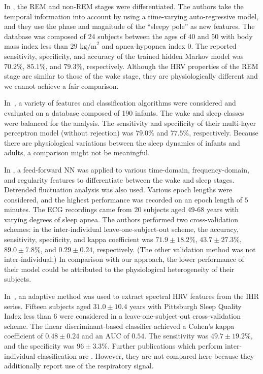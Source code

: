 \documentclass[10pt,a4paper,english]{amsart}
\begin{document}
In \cite{Mendez2010}, the REM and non-REM stages were differentiated. The authors take the temporal information into account by using a time-varying auto-regressive model, and they use the phase and magnitude of the ``sleepy pole'' as new features. The database was composed of 24 subjects between the ages of $40$ and $50$ with body mass index less than $29$ $\mathrm{kg/m}^2$ and apnea-hypopnea index $0$. The reported sensitivity, specificity, and accuracy of the trained hidden Markov model was $70.2\%$, $85.1\%$, and $79.3\%$, respectively. Although the HRV properties of the REM stage are similar to those of the wake stage, they are physiologically different and we cannot achieve a fair comparison.
%

In~\cite{Lewicke2008}, a variety of features and classification algorithms were considered and evaluated on a database composed of 190 infants. The wake and sleep classes were balanced for the analysis. The sensitivity and specificity of their multi-layer perceptron model (without rejection) was $79.0 \%$ and $77.5 \%$, respectively. Because there are physiological variations between the sleep dynamics of infants and adults, a comparison might not be meaningful.

In \cite{Aktaruzzaman2015}, a feed-forward NN was applied to various time-domain, frequency-domain, and regularity features to differentiate between the wake and sleep stages.  Detrended fluctuation analysis was also used. Various epoch lengths were considered, and the highest performance was recorded on an epoch length of $5$ minutes. The ECG recordings came from $20$ subjects aged $49$-$68$ years with varying degrees of sleep apnea. The authors performed two cross-validation schemes: in the inter-individual leave-one-subject-out scheme, the accuracy, sensitivity, specificity, and kappa coefficient was $71.9 \pm 18.2 \%$, $43.7 \pm 27.3 \%$, $89.0 \pm 7.8 \%$, and $0.29 \pm 0.24$, respectively. (The other validation method was not inter-individual.) In comparison with our approach, the lower performance of their model could be attributed to the physiological heterogeneity of their subjects.

In~\cite{Long2012}, an adaptive method was used to extract spectral HRV features from the IHR series.  
Fifteen subjects aged $31.0 \pm 10.4$ years with Pittsburgh Sleep Quality Index less than $6$ were considered in a leave-one-subject-out cross-validation scheme. The linear discriminant-based classifier achieved a Cohen's kappa coefficient of $0.48 \pm 0.24$ and an $\mathrm{AUC}$ of $0.54$. The sensitivity was $49.7 \pm 19.2 \%$, and the specificity was $96 \pm 3.3\%$.  
Further publications which perform inter-individual classification are \cite{Thomas2005,karlen:2009,Fonseca2015}. However, they are not compared here because they additionally report use of the respiratory signal.
%
\end{document}
